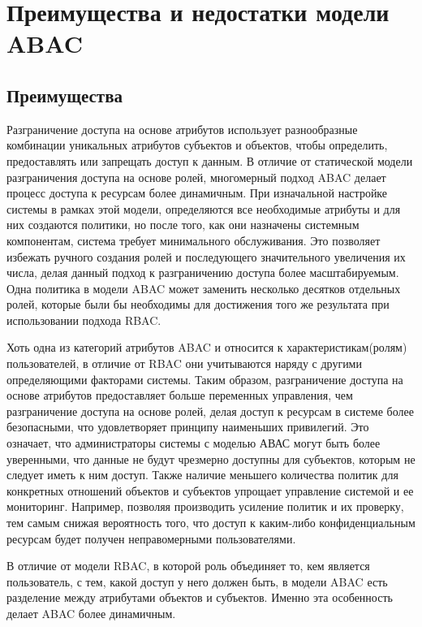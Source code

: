 \documentclass[a4paper,14pt]{article}
\begin{document}
\section{Преимущества и недостатки модели ABAC}

\subsection{Преимущества}

Разграничение доступа на основе атрибутов использует разнообразные комбинации уникальных атрибутов субъектов и объектов, чтобы определить, предоставлять или запрещать доступ к данным. В отличие от статической модели разграничения доступа на основе ролей, многомерный подход ABAC делает процесс доступа к ресурсам более динамичным. При изначальной настройке системы в рамках этой модели, определяются все необходимые атрибуты и для них создаются политики, но после того, как они назначены системным компонентам, система требует минимального обслуживания. Это позволяет избежать ручного создания ролей и последующего значительного увеличения их числа, делая данный подход к разграничению доступа более масштабируемым. Одна политика в модели ABAC может заменить несколько десятков отдельных ролей, которые были бы необходимы для достижения того же результата при использовании подхода RBAC. 


Хоть одна из категорий атрибутов ABAC и относится к характеристикам(ролям) пользователей, в отличие от RBAC они учитываются наряду с другими определяющими факторами системы. Таким образом, разграничение доступа на основе атрибутов предоставляет больше переменных управления, чем разграничение доступа на основе ролей, делая доступ к ресурсам в системе более безопасными, что удовлетворяет принципу наименьших привилегий. Это означает, что администраторы системы с моделью АВАС могут быть более уверенными, что данные не будут чрезмерно доступны для субъектов, которым не следует иметь к ним доступ. Также наличие меньшего количества политик для конкретных отношений объектов и субъектов упрощает управление системой и ее мониторинг. Например, позволяя производить усиление политик и их проверку, тем самым снижая вероятность того, что доступ к каким-{}либо конфиденциальным ресурсам будет получен неправомерными пользователями. 


В отличие от модели RBAC, в которой роль объединяет то, кем является пользователь, с тем, какой доступ у него должен быть, в модели ABAC есть разделение между атрибутами объектов и субъектов. Именно эта особенность делает ABAC более динамичным. 
\end{document}

